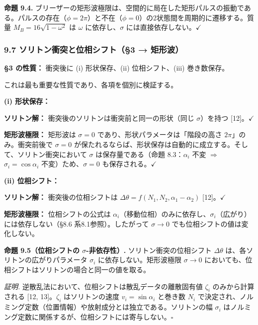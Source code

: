 \documentclass[a4paper,11pt]{ltjsarticle}
\begin{document}
\textbf{命題 9.4.}
ブリーザーの矩形波極限は、空間的に局在した矩形パルスの振動である。パルスの存在（\(\phi = 2\pi\)）と不在（\(\phi = 0\)）の2状態間を周期的に遷移する。質量
\(M_B = 16\sqrt{1-\omega^2}\) は \(\omega\) に依存し、\(\sigma\)
には直接依存しない。\(\checkmark\)

\subsubsection{9.7 ソリトン衝突と位相シフト（§3 →
矩形波）}\label{ux30bdux30eaux30c8ux30f3ux885dux7a81ux3068ux4f4dux76f8ux30b7ux30d5ux30c83-ux77e9ux5f62ux6ce2}

\textbf{§3 の性質：} 衝突後に (i) 形状保存、(ii) 位相シフト、(iii)
巻き数保存。

これは最も重要な性質であり、各項を個別に検証する。

\textbf{(i) 形状保存：}

\textbf{ソリトン解：} 衝突後のソリトンは衝突前と同一の形状（同じ
\(\sigma\)）を持つ {[}12{]}。\(\checkmark\)

\textbf{矩形波極限：} 矩形波は \(\sigma = 0\)
であり、形状パラメータは「階段の高さ \(2\pi\)」のみ。衝突前後で
\(\sigma = 0\)
が保たれるならば、形状保存は自動的に成立する。そして、ソリトン衝突において
\(\sigma\) は保存量である（命題 8.3：\(\alpha_i\) 不変 \(\Rightarrow\)
\(\sigma_i = \cos\alpha_i\) 不変）ため、\(\sigma = 0\)
も保存される。\(\checkmark\)

\textbf{(ii) 位相シフト：}

\textbf{ソリトン解：} 衝突後の位相シフトは
\(\Delta\theta = f(N_1, N_2, \alpha_1 - \alpha_2)\)
{[}12{]}。\(\checkmark\)

\textbf{矩形波極限：} 位相シフトの公式は
\(\alpha_i\)（移動位相）のみに依存し、\(\sigma_i\)（広がり）には依存しない（§8.6
系8.1参照）。したがって \(\sigma \to 0\)
でも位相シフトの値は変化しない。

\textbf{命題 9.5（位相シフトの \(\sigma\)-非依存性）.}
ソリトン衝突の位相シフト \(\Delta\theta\)
は、各ソリトンの広がりパラメータ \(\sigma_i\) に依存しない。矩形波極限
\(\sigma \to 0\)
においても、位相シフトはソリトンの場合と同一の値を取る。

\emph{証明.} 逆散乱法において、位相シフトは散乱データの離散固有値
\(\zeta_i\) のみから計算される {[}12, 13{]}。\(\zeta_i\)
はソリトンの速度 \(v_i = \sin\alpha_i\) と巻き数 \(N_i\)
で決定され、ノルミング定数（位置情報）や放射成分とは独立である。ソリトンの幅
\(\sigma_i\)
はノルミング定数に関係するが、位相シフトには寄与しない。\(\square\)
\end{document}
